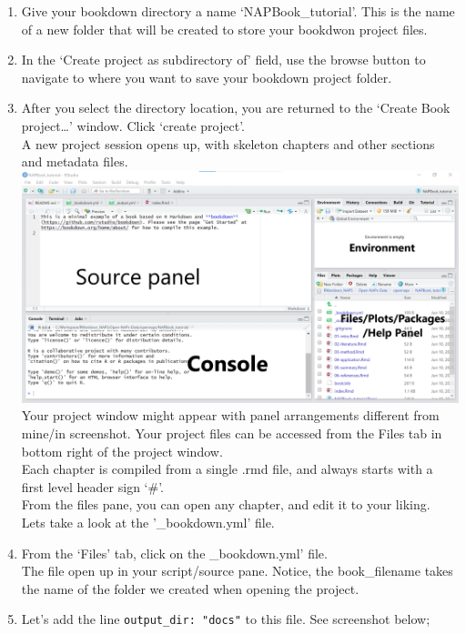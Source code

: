 \documentclass[
]{book}
\providecommand{\tightlist}{%
  \setlength{\itemsep}{0pt}\setlength{\parskip}{0pt}}
\begin{document}
\begin{enumerate}
\def\labelenumi{\arabic{enumi}.}
\setcounter{enumi}{3}
\tightlist
\item
  Give your bookdown directory a name `NAPBook\_tutorial'. This is the name of a new folder that will be created to store your bookdwon project files.\\
\item
  In the `Create project as subdirectory of' field, use the browse button to navigate to where you want to save your bookdown project folder.\\
\item
  After you select the directory location, you are returned to the `Create Book project\ldots{}' window. Click `create project'.\\
  A new project session opens up, with skeleton chapters and other sections and metadata files.\\
  \includegraphics{tutorial_screenshots/bkdn_proj_window_label.png}\\
  Your project window might appear with panel arrangements different from mine/in screenshot. Your project files can be accessed from the Files tab in bottom right of the project window.\\
  Each chapter is compiled from a single .rmd file, and always starts with a first level header sign `\#'.\\
  From the files pane, you can open any chapter, and edit it to your liking.\\
  Lets take a look at the '\_bookdown.yml' file.\\
\item
  From the `Files' tab, click on the \_bookdown.yml' file.\\
  The file open up in your script/source pane. Notice, the book\_filename takes the name of the folder we created when opening the project.\\
\item
  Let's add the line \texttt{output\_dir:\ "docs"} to this file.
  See screenshot below;
\end{enumerate}
\end{document}
